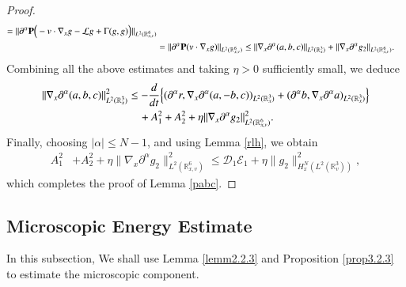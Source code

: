 \documentclass{amsart}[12pt, article]
\begin{document}
\begin{proof}
\begin{align}
=\|{{\partial}}^\alpha  {{\bf P}}\Big(-v\cdot\nabla_xg-\mathcal{L}g+\Gamma(g,g)\Big)\|_{L^2({{{\mathbb R}}}^6_{x, v})}
\\&=\|{{\partial}}^\alpha  {{\bf P}}(v\cdot\nabla_xg)\|_{L^2({{{\mathbb R}}}^6_{x, v})}
\le \|\nabla_x{{\partial}}^\alpha  (a,b,c)\|_{L^2({{{\mathbb R}}}^3_x)}+
\|\nabla_x{{\partial}}^\alpha g_2\|_{L^2({{{\mathbb R}}}^6_{x, v})}.\notag
\end{align}
Combining all the above estimates and
taking $\eta>0$ sufficiently small, we deduce
\begin{align*}
\|\nabla_x {{\partial}}^\alpha (a, b,  c)\|_{L^2({{{\mathbb R}}}^3_x)}^2
&\le
-\frac{d}{dt}\Big\{({{\partial}}^\alpha r,\nabla_x {{\partial}}^\alpha (a, -b,c))_{L^2({{{\mathbb R}}}^3_x)}
+({{\partial}}^\alpha b, \nabla_x {{\partial}}^\alpha a)_{L^2({{{\mathbb R}}}^3_x)}\Big\}
\\&\quad +\notag
A_1^2+A_2^2+
 \eta\|\nabla_x{{\partial}}^\alpha g_2\|_{L^2({{{\mathbb R}}}^6_{x, v})}^2.
\end{align*}
Finally, choosing $|\alpha|\le N-1$, and using Lemma \eqref{rlh}, we obtain
\begin{align*}
A_1^2&+A_2^2+
 \eta\|\nabla_x{{\partial}}^\alpha g_2\|_{L^2({{{\mathbb R}}}^6_{x, v})}^2
\le \mathcal D_1\mathcal E_1 +\eta \|g_2\|_{H^{N}_x(L^2({{{\mathbb R}}}^3_v))}^2,
\end{align*}
which  completes the proof of Lemma \ref{pabc}.
\end{proof}

\subsection{Microscopic Energy Estimate}\label{section7.2}
\setcounter{equation}{0}
In this subsection,
We shall use Lemma \ref{lemm2.2.3} and Proposition \ref{prop3.2.3} to
estimate the microscopic component.
\end{document}
